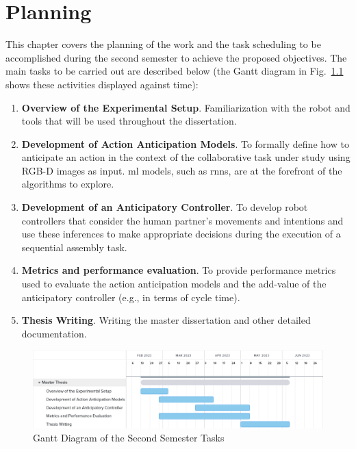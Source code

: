 \chapter{Planning}
\label{chapter:planning}

This chapter covers the planning of the work and the task scheduling to be accomplished during the second semester to achieve the proposed objectives. The main tasks to be carried out are described below (the Gantt diagram in Fig.~\ref{fig:gantt} shows these activities displayed against time):

\begin{enumerate}
    \item \textbf{Overview of the Experimental Setup}. Familiarization with the robot and tools that will be used throughout the dissertation.

    \item \textbf{Development of Action Anticipation Models}. To formally define how to anticipate an action in the context of the collaborative task under study using RGB-D images as input. \acs{ml} models, such as \acfp{rnn}, are at the forefront of the algorithms to explore.
    
    \item \textbf{Development of an Anticipatory Controller}. To develop robot controllers that consider the human partner's movements and intentions and use these inferences to make appropriate decisions during the execution of a sequential assembly task.

    \item \textbf{Metrics and performance evaluation}. To provide performance metrics used to evaluate the action anticipation models and the add-value of the anticipatory controller (e.g., in terms of cycle time).
    
    \item \textbf{Thesis Writing}. Writing the master dissertation and other detailed documentation.
\end{enumerate}

\begin{figure}
\centering
\includegraphics[width=9in]{figs/gantt.PNG}
\caption{Gantt Diagram of the Second Semester Tasks}
\label{fig:gantt}
\end{figure}
